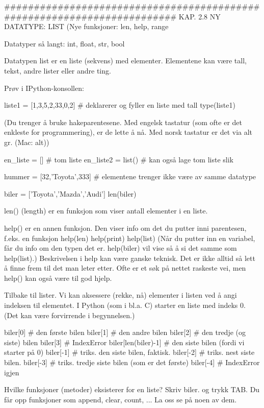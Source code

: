 ######################################################################## 
KAP. 2.8  NY DATATYPE: LIST
(Nye funksjoner: len, help, range

Datatyper så langt: int, float, str, bool


Datatypen list er en liste (sekvens) med elementer. 
Elementene kan være tall, tekst, andre lister eller andre ting.

Prøv i IPython-konsollen:

liste1 = [1,3,5,2,33,0,2]  # deklarerer og fyller en liste med tall
type(liste1)

(Du trenger å bruke hakeparentesene. 
Med engelsk tastatur (som ofte er det enkleste for programmering), 
er de lette å nå. Med norsk tastatur er det via alt gr. (Mac: alt)) 

en_liste = []        # tom liste
en_liste2 = list()   # kan også lage tom liste slik

hummer = [32,'Toyota',333]   # elementene trenger ikke være av samme datatype

biler = ['Toyota','Mazda','Audi'] 
len(biler) 

len() (length) er en funksjon som viser antall elementer i en liste. 


help() er en annen funksjon. Den viser info om det du putter inni parentesen, 
f.eks. en funksjon
help(len)
help(print)
help(list)
(Når du putter inn en variabel, får du info om den typen det er. 
help(biler) vil vise så å si det samme som help(list).)  
Beskrivelsen i help kan være ganske teknisk. 
Det er ikke alltid så lett å finne frem til det man leter etter.
Ofte er et søk på nettet raskeste vei, men help() kan også være til god hjelp. 


Tilbake til lister. 
Vi kan aksessere (rekke, nå) elementer i listen ved å angi indeksen til elementet. 
I Python (som i bl.a. C) starter en liste med indeks 0.
(Det kan være forvirrende i begynnelsen.) 

biler[0]       # den første bilen 
biler[1]       # den andre bilen
biler[2]       # den tredje (og siste) bilen
biler[3]       # IndexError
biler[len(biler)-1]   # den siste bilen (fordi vi starter på 0) 
biler[-1]      # triks. den siste bilen, faktisk. 
biler[-2]      # triks. nest siste bilen. 
biler[-3]      # triks. tredje siste bilen (som er det første)
biler[-4]      # IndexError igjen


Hvilke funksjoner (metoder) eksisterer for en liste?
Skriv biler. og trykk TAB. 
Du får opp funksjoner som append, clear, count, ... 
La oss se på noen av dem. 


